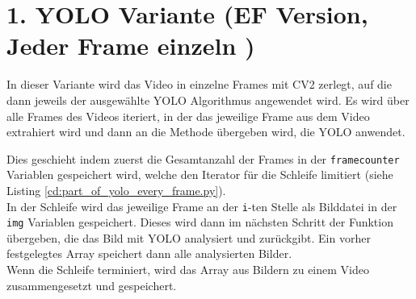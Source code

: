 


\section{1. YOLO Variante (EF Version, Jeder Frame einzeln )} {
	\label{py:YOLO_every_frame}
	In dieser Variante wird das Video in einzelne Frames mit CV2 zerlegt, auf die dann jeweils der ausgewählte YOLO Algorithmus angewendet wird. 
	Es wird über alle Frames des Videos iteriert, in der das jeweilige Frame aus dem Video extrahiert wird und dann an die Methode übergeben wird, die YOLO anwendet.
	
	Dies geschieht indem zuerst die Gesamtanzahl der Frames in der \lstinline|framecounter| Variablen gespeichert wird, welche den Iterator für die Schleife limitiert (siehe Listing \ref{cd:part_of_yolo_every_frame.py}). \\ 
	In der Schleife wird das jeweilige Frame an der \lstinline|i|-ten Stelle als Bilddatei in der \lstinline|img| Variablen gespeichert. Dieses wird dann im nächsten Schritt der Funktion übergeben, die das Bild mit YOLO analysiert und zurückgibt. Ein vorher festgelegtes Array speichert dann alle analysierten Bilder. \\ 
	Wenn die Schleife terminiert, wird das Array aus Bildern zu einem Video zusammengesetzt und gespeichert. \\

	
	
	
}
